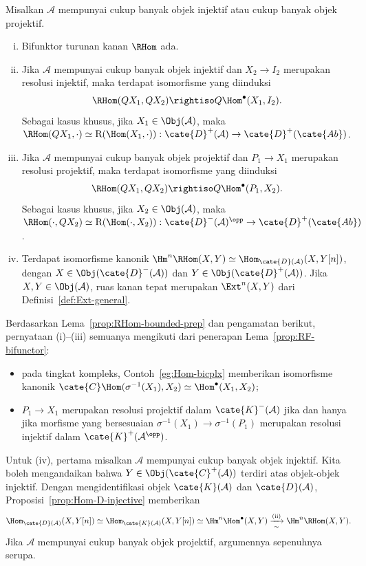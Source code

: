 \begin{teorema}\label{prop:RHom}\label{prop:RHom-bounded}
	Misalkan $\mathcal{A}$ mempunyai cukup banyak objek injektif atau cukup
	banyak objek projektif.
	\begin{enumerate}[(i)]
		\item Bifunktor turunan kanan $\RHom$ ada.
		\item Jika $\mathcal{A}$ mempunyai cukup banyak objek injektif dan
		$X_2\to I_2$ merupakan resolusi injektif, maka terdapat isomorfisme yang diinduksi
		\[ \RHom(QX_1, QX_2) \rightiso Q \Hom^\bullet(X_1, I_2). \]
		Sebagai kasus khusus, jika $X_1\in\Obj(\mathcal{A})$, maka
		$\RHom(QX_1,\cdot)\simeq\mathrm{R}(\Hom(X_1,\cdot)):
		\cate{D}^+(\mathcal{A})\to\cate{D}^+(\cate{Ab})$.
		\item Jika $\mathcal{A}$ mempunyai cukup banyak objek projektif dan
		$P_1\to X_1$ merupakan resolusi projektif, maka terdapat isomorfisme yang diinduksi
		\[ \RHom(QX_1, QX_2) \rightiso Q \Hom^\bullet(P_1, X_2). \]
		Sebagai kasus khusus, jika $X_2\in\Obj(\mathcal{A})$, maka
		$\RHom(\cdot,QX_2)\simeq\mathrm{R}(\Hom(\cdot,X_2)):
		\cate{D}^-(\mathcal{A})^{\opp}\to\cate{D}^+(\cate{Ab})$.
		\item Terdapat isomorfisme kanonik
		$\Hm^n\RHom(X,Y)\simeq
		\Hom_{\cate{D}(\mathcal{A})}(X,Y[n])$, dengan
		$X\in\Obj(\cate{D}^-(\mathcal{A}))$ dan
		$Y\in\Obj(\cate{D}^+(\mathcal{A}))$. Jika
		$X,Y\in\Obj(\mathcal{A})$, ruas kanan tepat merupakan
		$\Ext^n(X,Y)$ dari Definisi~\ref{def:Ext-general}.
	\end{enumerate}
\end{teorema}
\begin{bukti}
	Berdasarkan Lema~\ref{prop:RHom-bounded-prep} dan pengamatan berikut,
	pernyataan (i)--(iii) semuanya mengikuti dari penerapan
	Lema~\ref{prop:RF-bifunctor}:
	\begin{itemize}
		\item pada tingkat kompleks, Contoh~\ref{eg:Hom-bicplx} memberikan
		isomorfisme kanonik
		$\cate{C}\Hom(\sigma^{-1}(X_1),X_2)\simeq\Hom^\bullet(X_1,X_2)$;
		\item $P_1\to X_1$ merupakan resolusi projektif dalam
		$\cate{K}^-(\mathcal{A})$ jika dan hanya jika morfisme yang bersesuaian
		$\sigma^{-1}(X_1)\to\sigma^{-1}(P_1)$ merupakan resolusi injektif dalam
		$\cate{K}^+(\mathcal{A}^{\opp})$.
	\end{itemize}

	Untuk (iv), pertama misalkan $\mathcal{A}$ mempunyai cukup banyak objek
	injektif. Kita boleh mengandaikan bahwa
	$Y\in\Obj(\cate{C}^+(\mathcal{A}))$ terdiri atas objek-objek injektif.
	Dengan mengidentifikasi objek $\cate{K}(\mathcal{A})$ dan
	$\cate{D}(\mathcal{A})$, Proposisi~\ref{prop:Hom-D-injective} memberikan
	\[ \Hom_{\cate{D}(\mathcal{A})}(X, Y[n]) \simeq \Hom_{\cate{K}(\mathcal{A})}(X, Y[n]) \simeq \Hm^n \Hom^\bullet(X, Y) \xrightarrow[\sim]{\text{(ii)}} \Hm^n \RHom(X, Y). \]
	Jika $\mathcal{A}$ mempunyai cukup banyak objek projektif, argumennya
	sepenuhnya serupa.
\end{bukti}

